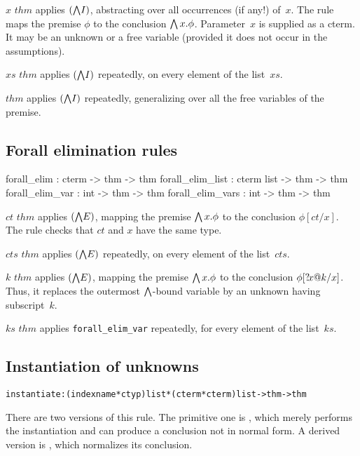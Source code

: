 \begin{ttdescription}
\item[\ttindexbold{forall_intr} $x$ $thm$] 
applies $({\bigwedge}I)$, abstracting over all occurrences (if any!) of~$x$.
The rule maps the premise $\phi$ to the conclusion $\bigwedge x.\phi$.
Parameter~$x$ is supplied as a cterm.  It may be an unknown or a free
variable (provided it does not occur in the assumptions).

\item[\ttindexbold{forall_intr_list} $xs$ $thm$] 
applies $({\bigwedge}I)$ repeatedly, on every element of the list~$xs$.

\item[\ttindexbold{forall_intr_frees} $thm$] 
applies $({\bigwedge}I)$ repeatedly, generalizing over all the free variables
of the premise.
\end{ttdescription}


\subsection{Forall elimination rules}
\begin{ttbox} 
forall_elim       : cterm      -> thm -> thm
forall_elim_list  : cterm list -> thm -> thm
forall_elim_var   :        int -> thm -> thm
forall_elim_vars  :        int -> thm -> thm
\end{ttbox}

\begin{ttdescription}
\item[\ttindexbold{forall_elim} $ct$ $thm$] 
applies $({\bigwedge}E)$, mapping the premise $\bigwedge x.\phi$ to the conclusion
$\phi[ct/x]$.  The rule checks that $ct$ and $x$ have the same type.

\item[\ttindexbold{forall_elim_list} $cts$ $thm$] 
applies $({\bigwedge}E)$ repeatedly, on every element of the list~$cts$.

\item[\ttindexbold{forall_elim_var} $k$ $thm$] 
applies $({\bigwedge}E)$, mapping the premise $\bigwedge x.\phi$ to the conclusion
$\phi[{?\!x@k}/x]$.  Thus, it replaces the outermost $\bigwedge$-bound
variable by an unknown having subscript~$k$.

\item[\ttindexbold{forall_elim_vars} $ks$ $thm$] 
applies {\tt forall_elim_var} repeatedly, for every element of the list~$ks$.
\end{ttdescription}


\subsection{Instantiation of unknowns}
\begin{alltt}\footnotesize
instantiate: (indexname * ctyp){\thinspace}list * (cterm * cterm){\thinspace}list -> thm -> thm
\end{alltt}
There are two versions of this rule.  The primitive one is
, which merely performs the instantiation and can
produce a conclusion not in normal form.  A derived version is  
, which normalizes its conclusion.

